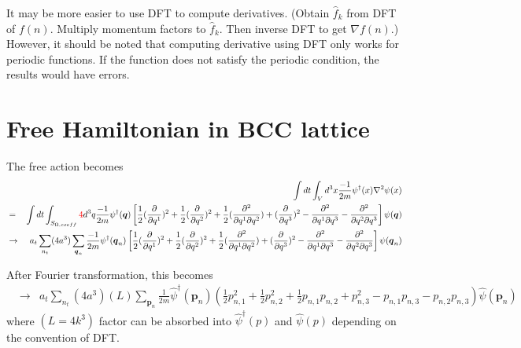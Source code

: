 \documentclass[10pt]{book}
\def\bm{\boldsymbol}
\newcommand{\bea}{\begin{eqnarray}}
\newcommand{\eea}{\end{eqnarray}}
\newcommand{\no}{\nonumber \\}
\newcommand{\del}{\partial}
\begin{document}
It may be more easier to use DFT to compute derivatives.
(Obtain $\hat{f}_k$ from DFT of $f(n)$. Multiply momentum factors 
to $\hat{f}_k$. Then inverse DFT to get $\nabla f(n)$.)
However, it should be noted that computing derivative using DFT
only works for periodic functions. If the function does not satisfy the 
periodic condition, the results would have errors. 

\section{Free Hamiltonian in BCC lattice}

The free action becomes
\bea 
& &\int dt \int_V d^3 x \frac{-1}{2m}\psi^\dagger(x)\nabla^2\psi(x) \no 
&=&\int dt \int_{S_{\Omega,coeff}} {\color{red}4} d^3 q \frac{-1}{2m} \psi^\dagger({\bm q})\left[ \frac{1}{2}(\frac{\del}{\del q^1})^2+\frac{1}{2}(\frac{\del}{\del q^2})^2
+ \frac{1}{2}(\frac{\del^2}{\del q^1 \del q^2})
+(\frac{\del}{\del q^3})^2-\frac{\del^2}{\del q^1 \del q^3}  
-\frac{\del^2}{\del q^2 \del q^3}
\right]\psi({\bm q}) \no 
&\to& a_t \sum_{n_t} (4a^3) \sum_{{\bm q}_n} 
    \frac{-1}{2m} \psi^\dagger({\bm q}_n)\left[ \frac{1}{2}(\frac{\del}{\del q^1})^2+\frac{1}{2}(\frac{\del}{\del q^2})^2
    + \frac{1}{2}(\frac{\del^2}{\del q^1 \del q^2})
    +(\frac{\del}{\del q^3})^2-\frac{\del^2}{\del q^1 \del q^3}  
    -\frac{\del^2}{\del q^2 \del q^3}
    \right]\psi({\bm q}_n) \nonumber 
\eea 

After Fourier transformation, this becomes
\bea 
&\to& a_t \sum_{n_t} (4a^3) (L)\sum_{{\bm p}_n} 
\frac{1}{2m} \hat{\psi}^\dagger({\bm p}_n)(\frac{1}{2} p_{n,1}^2+\frac{1}{2}p_{n,2}^2+\frac{1}{2}p_{n,1} p_{n,2}
+p_{n,3}^2-p_{n,1} p_{n,3}-p_{n,2} p_{n,3}) \hat{\psi}({\bm p}_n) \nonumber 
\eea 
where $(L=4k^3)$ factor can be absorbed into $\hat{\psi}^\dagger(p)$ and $\hat{\psi}(p)$
depending on the convention of DFT. 
\end{document}

